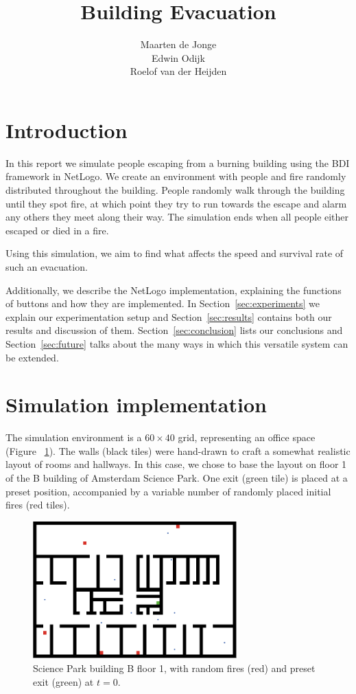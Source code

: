 \documentclass[a4paper]{article}
\title{Building Evacuation}
\author{Maarten de Jonge \\
        Edwin Odijk \\
        Roelof van der Heijden}
\begin{document}
\maketitle

\section{Introduction}
In this report we simulate people escaping from a burning building using the BDI framework in NetLogo. We create an environment with people and fire randomly distributed throughout the building. People randomly walk through the building until they spot fire, at which point they try to run towards the escape and alarm any others they meet along their way. The simulation ends when all people either escaped or died in a fire.

Using this simulation, we aim to find what affects the speed and survival rate of such an evacuation.

Additionally, we describe the NetLogo implementation, explaining the functions of buttons and how they are implemented. In Section~\ref{sec:experiments} we explain our experimentation setup and Section~\ref{sec:results} contains both our results and discussion of them. Section~\ref{sec:conclusion} lists our conclusions and Section~\ref{sec:future} talks about the many ways in which this versatile system can be extended.

\section{Simulation implementation}
\FloatBarrier
The simulation environment is a \(60\times 40\) grid, representing an office space (Figure~
\ref{fig:sp}). The walls (black tiles) were hand-drawn to craft a somewhat
realistic layout of rooms and hallways. In this case, we chose to base the layout on floor 1 of the B building of Amsterdam Science Park. One exit (green tile) is placed
at a preset position, accompanied by a variable number of randomly placed initial fires (red tiles). 

\begin{figure}[h!]
  \centering
  \includegraphics[width=0.7\textwidth]{sp.png}
  \caption{Science Park building B floor 1, with random fires (red) and preset exit (green) at \(t=0\).}
  \label{fig:sp}
\end{figure}
\end{document}
